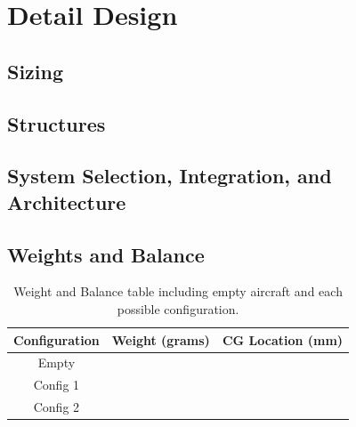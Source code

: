 \documentclass[report]{byu-aero}
\begin{document}
\section{Detail Design} %
\label{sec:detaildesign}




\subsection{Sizing}
\label{ssec:sizing}




\subsection{Structures}
\label{ssec:structures}




\subsection{System Selection, Integration, and Architecture}
\label{ssec:systemdetails}




\subsection{Weights and Balance}
\label{ssec:weightsandbalance}


\begin{table}[h!]
	\centering
	\caption{Weight and Balance table including empty aircraft and each possible configuration.}
	\label{tab:wieghtsandbalance}
	\begin{tabular}{ |c|c|c| } 
		\hline
		\rowcolor{BYUbluemid}
    	Configuration & Weight (grams) & CG Location (mm) \\ 
		\hline
	    Empty &  &  \\ 
		\hline
		Config 1 &  &  \\ 
		\hline
		Config 2 &  &  \\ 
		\hline
	\end{tabular}
\end{table}
\end{document}
